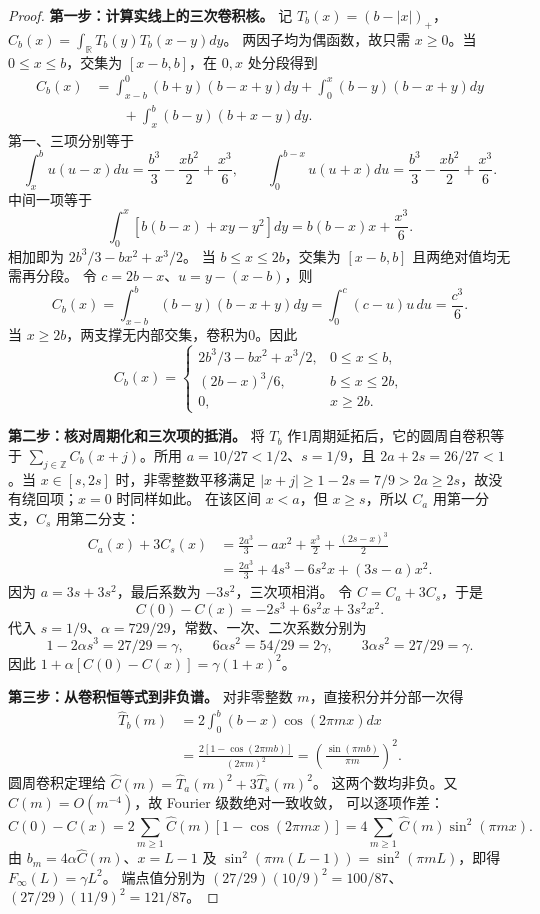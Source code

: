 \documentclass[UTF8,a4paper,11pt,fontset=fandol]{ctexart}
\theoremstyle{remark}
\begin{document}
\begin{proof}
\textbf{第一步：计算实线上的三次卷积核。}
记 $T_b(x)=(b-|x|)_+$，$C_b(x)=\int_{\mathbb R}T_b(y)T_b(x-y)dy$。
两因子均为偶函数，故只需 $x\ge0$。当 $0\le x\le b$，交集为
$[x-b,b]$，在 $0,x$ 处分段得到
\begin{align*}
 C_b(x)&=\int_{x-b}^0(b+y)(b-x+y)dy
 +\int_0^x(b-y)(b-x+y)dy\\
 &\qquad+\int_x^b(b-y)(b+x-y)dy.
\end{align*}
第一、三项分别等于
\[
 \int_x^b u(u-x)du=\frac{b^3}{3}-\frac{xb^2}{2}+\frac{x^3}{6},
 \qquad\int_0^{b-x}u(u+x)du
 =\frac{b^3}{3}-\frac{xb^2}{2}+\frac{x^3}{6}.
\]
中间一项等于
\[
 \int_0^x[b(b-x)+xy-y^2]dy=b(b-x)x+\frac{x^3}{6}.
\]
相加即为 $2b^3/3-bx^2+x^3/2$。
当 $b\le x\le2b$，交集为 $[x-b,b]$ 且两绝对值均无需再分段。
令 $c=2b-x$、$u=y-(x-b)$，则
\[
 C_b(x)=\int_{x-b}^b(b-y)(b-x+y)dy
 =\int_0^c(c-u)u\,du=\frac{c^3}{6}.
\]
当 $x\ge2b$，两支撑无内部交集，卷积为0。因此
\[
 C_b(x)=\begin{cases}
 2b^3/3-bx^2+x^3/2,&0\le x\le b,\\
 (2b-x)^3/6,&b\le x\le2b,\\0,&x\ge2b.
 \end{cases}
\]

\textbf{第二步：核对周期化和三次项的抵消。}
将 $T_b$ 作1周期延拓后，它的圆周自卷积等于
$\sum_{j\in\mathbb Z}C_b(x+j)$。所用 $a=10/27<1/2$、$s=1/9$，且
$2a+2s=26/27<1$。当 $x\in[s,2s]$ 时，非零整数平移满足
$|x+j|\ge1-2s=7/9>2a\ge2s$，故没有绕回项；$x=0$ 时同样如此。
在该区间 $x<a$，但 $x\ge s$，所以 $C_a$ 用第一分支，$C_s$ 用第二分支：
\begin{align*}
 C_a(x)+3C_s(x)
 &=\frac{2a^3}{3}-ax^2+\frac{x^3}{2}
   +\frac{(2s-x)^3}{2}\\
 &=\frac{2a^3}{3}+4s^3-6s^2x+(3s-a)x^2.
\end{align*}
因为 $a=3s+3s^2$，最后系数为 $-3s^2$，三次项相消。
令 $C=C_a+3C_s$，于是
\[
 C(0)-C(x)=-2s^3+6s^2x+3s^2x^2.
\]
代入 $s=1/9$、$\alpha=729/29$，常数、一次、二次系数分别为
\[
 1-2\alpha s^3=27/29=\gamma,\qquad
 6\alpha s^2=54/29=2\gamma,\qquad
 3\alpha s^2=27/29=\gamma.
\]
因此 $1+\alpha[C(0)-C(x)]=\gamma(1+x)^2$。

\textbf{第三步：从卷积恒等式到非负谱。}
对非零整数 $m$，直接积分并分部一次得
\begin{align*}
 \widehat T_b(m)&=2\int_0^b(b-x)\cos(2\pi mx)dx\\
 &=\frac{2[1-\cos(2\pi mb)]}{(2\pi m)^2}
 =\left(\frac{\sin(\pi mb)}{\pi m}\right)^2.
\end{align*}
圆周卷积定理给
$\widehat C(m)=\widehat T_a(m)^2+3\widehat T_s(m)^2$。
这两个数均非负。又 $\widehat C(m)=O(m^{-4})$，故 Fourier 级数绝对一致收敛，
可以逐项作差：
\[
 C(0)-C(x)=2\sum_{m\ge1}\widehat C(m)[1-\cos(2\pi mx)]
 =4\sum_{m\ge1}\widehat C(m)\sin^2(\pi mx).
\]
由 $b_m=4\alpha\widehat C(m)$、$x=L-1$ 及
$\sin^2(\pi m(L-1))=\sin^2(\pi mL)$，即得 $F_\infty(L)=\gamma L^2$。
端点值分别为
$(27/29)(10/9)^2=100/87$、$(27/29)(11/9)^2=121/87$。


\end{proof}
\end{document}
